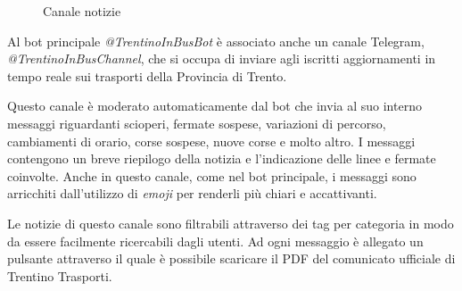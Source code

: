 \begin{wrapfigure}{r}{0.38\textwidth}
\centering
{}
\caption{Canale notizie}
\label{fig:bot-canale-notizie}
\end{wrapfigure}

Al bot principale \textit{@TrentinoInBusBot} è associato anche un canale Telegram, \textit{@TrentinoInBusChannel}, che si occupa di inviare agli iscritti aggiornamenti in tempo reale sui trasporti della Provincia di Trento. 

Questo canale è moderato automaticamente dal bot che invia al suo interno messaggi riguardanti scioperi, fermate sospese, variazioni di percorso, cambiamenti di orario, corse sospese, nuove corse e molto altro. I messaggi contengono un breve riepilogo della notizia e l'indicazione delle linee e fermate coinvolte. Anche in questo canale, come nel bot principale, i messaggi sono arricchiti dall'utilizzo di \textit{emoji} per renderli più chiari e accattivanti.

Le notizie di questo canale sono filtrabili attraverso dei tag per categoria in modo da essere facilmente ricercabili dagli utenti. Ad ogni messaggio è allegato un pulsante attraverso il quale è possibile scaricare il PDF del comunicato ufficiale di Trentino Trasporti.





